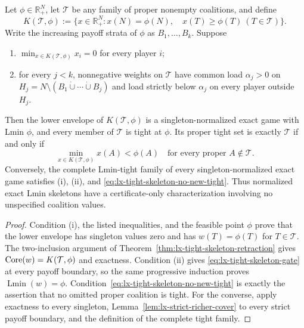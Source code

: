 \begin{corollary}
\label{cor:lx-tight-skeleton-realization}
Let $\phi\in\mathbb R_+^N$, let $\mathcal T$ be any family of proper
nonempty coalitions, and define
\[
 K(\mathcal T,\phi):=\{x\in\mathbb R_+^N:x(N)=\phi(N),\quad
                         x(T)\geq\phi(T)\ (T\in\mathcal T)\}.
\]
Write the increasing payoff strata of $\phi$ as $B_1,\ldots,B_k$.  Suppose

\begin{enumerate}[label=(\roman*)]
\item $\min_{x\in K(\mathcal T,\phi)}x_i=0$ for every player $i$;
\item for every $j<k$, nonnegative weights on $\mathcal T$ have common
load $\alpha_j>0$ on
$H_j=N\setminus(B_1\mathbin{\dot\cup}\cdots\mathbin{\dot\cup}B_j)$
and load strictly below $\alpha_j$ on every player outside $H_j$.
\end{enumerate}
Then the lower envelope of $K(\mathcal T,\phi)$ is a
singleton-normalized exact game with Lmin $\phi$, and every member of
$\mathcal T$ is tight at $\phi$.  Its proper tight set is exactly
$\mathcal T$ if and only if
\[
 \min_{x\in K(\mathcal T,\phi)}x(A)<\phi(A)
 \quad\text{for every proper }A\notin\mathcal T.                 \tag{SK-6}
 \label{eq:lx-tight-skeleton-no-new-tight}
\]
Conversely, the complete Lmin-tight family of every
singleton-normalized exact game satisfies (i), (ii), and
\eqref{eq:lx-tight-skeleton-no-new-tight}.  Thus normalized exact Lmin
skeletons have a certificate-only characterization involving no unspecified
coalition values.
\end{corollary}

\begin{proof}
Condition (i), the listed inequalities, and the feasible point $\phi$ prove
that the lower envelope has singleton values zero and has
$w(T)=\phi(T)$ for $T\in\mathcal T$.  The two-inclusion argument of
Theorem~\ref{thm:lx-tight-skeleton-retraction} gives
$\operatorname{Core}(w)=K(\mathcal T,\phi)$ and exactness.  Condition (ii) gives
\eqref{eq:lx-tight-skeleton-gate} at every payoff boundary, so the same
progressive induction proves $\operatorname{Lmin}(w)=\phi$.
Condition~\eqref{eq:lx-tight-skeleton-no-new-tight} is exactly the assertion
that no omitted proper coalition is tight.  For the converse, apply
exactness to every singleton, Lemma~\ref{lem:lx-strict-richer-cover} to every
strict payoff boundary, and the definition of the complete tight family.
\end{proof}

